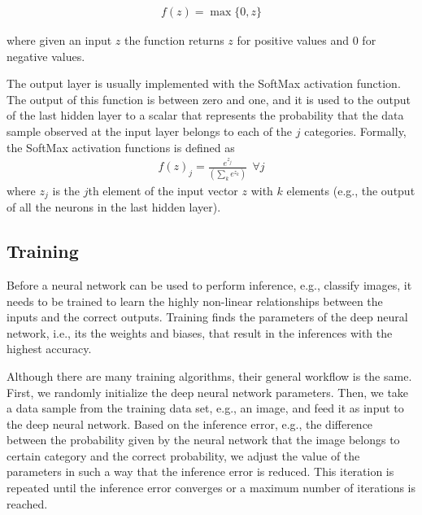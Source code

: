 \documentclass[letterpaper]{article}
\begin{document}
\begin{flushleft}
{\begin{align}\label{eq:ReLU}
f(z) = \max\{0, z\}
\end{align}

where given an input $z$ the function returns $z$ for positive values and $0$ for negative values.

The output layer is usually implemented with the SoftMax activation function. The output of this function is between zero and
one, and it is used to the output of the last hidden layer to a scalar that represents the probability that the data sample observed at
the input layer belongs to each of the $j$ categories. Formally, the SoftMax activation functions is defined as
\begin{align}\label{eq:SoftMax}
f(z)_j = \frac{e^{z_j}} {(\sum_ke^{z_k})} \ \  \forall j
\end{align}
where $z_j$ is the $j$th element of the input vector $z$ with $k$ elements (e.g., the output of all the neurons in the last hidden
layer).


\bigskip

\subsection{Training}
Before a neural network can be used to perform inference, e.g., classify images, it needs to be trained to learn the highly non-linear relationships between the inputs and the correct outputs. Training finds the
parameters of the deep neural network, i.e., its the weights and biases, that result in the inferences with the highest accuracy.  

Although there are many training algorithms, their general workflow is the same. 
First, we randomly initialize the deep neural network parameters.
Then, we take a data sample from the training data set, e.g., an image, and feed it as input to the deep neural network. Based on the
inference error, e.g., the difference between the probability given by the neural network that the image belongs to certain category
and the correct probability, we adjust the value of the parameters in such a way that the inference error is reduced. This iteration is
repeated until the inference error converges or a maximum number of iterations is reached. 


}
\end{flushleft}
\end{document}

